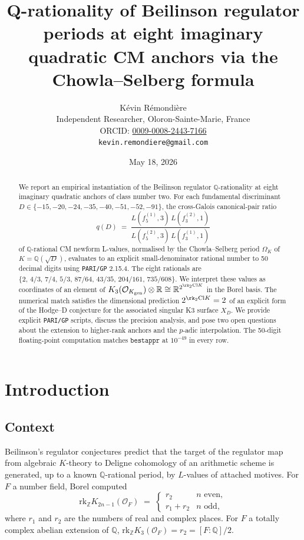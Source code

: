 \documentclass[11pt,a4paper]{amsart}
\title{Q-rationality of Beilinson regulator periods at eight imaginary
quadratic CM anchors via the Chowla--Selberg formula}
\author{K\'evin R\'emondi\`ere\\
\small Independent Researcher, Oloron-Sainte-Marie, France\\
\small ORCID: \href{https://orcid.org/0009-0008-2443-7166}{0009-0008-2443-7166}\\
\small \texttt{kevin.remondiere@gmail.com}}
\date{May 18, 2026}
\theoremstyle{plain}
\theoremstyle{definition}
\newcommand{\Q}{\mathbb{Q}}
\newcommand{\Z}{\mathbb{Z}}
\newcommand{\R}{\mathbb{R}}
\newcommand{\Cl}{\mathrm{Cl}}
\newcommand{\rkk}{\mathrm{rk}}
\begin{document}
\begin{abstract}
We report an empirical instantiation of the Beilinson regulator
$\Q$-rationality at eight imaginary quadratic anchors of class number two.
For each fundamental discriminant
$D \in \{-15,-20,-24,-35,-40,-51,-52,-91\}$, the cross-Galois canonical-pair
ratio
\[
  q(D) \;=\; \frac{L(f_5^{(1)},3)\,L(f_3^{(2)},1)}{L(f_5^{(2)},3)\,L(f_3^{(1)},1)}
\]
of $\Q$-rational CM newform L-values, normalised by the Chowla--Selberg period
$\Omega_K$ of $K=\Q(\sqrt{D})$, evaluates to an explicit small-denominator
rational number to 50 decimal digits using \texttt{PARI/GP} 2.15.4. The
eight rationals are
$\{2,\,4/3,\,7/4,\,5/3,\,87/64,\,43/35,\,204/161,\,735/608\}$.
We interpret these values as coordinates of an element of
$K_3(\mathcal{O}_{K_{\mathrm{gen}}})\otimes\R \cong \R^{2^{\rk_2 \Cl K}}$ in
the Borel basis. The numerical match satisfies the dimensional prediction
$2^{\rk_2 \Cl K} = 2$ of an explicit form of the Hodge--D conjecture for the
associated singular K3 surface $X_D$. We provide explicit
\texttt{PARI/GP} scripts, discuss the precision analysis, and pose two open
questions about the extension to higher-rank anchors and the $p$-adic
interpolation. The 50-digit floating-point computation matches
$\texttt{bestappr}$ at $10^{-49}$ in every row.
\end{abstract}

\maketitle

\section{Introduction}\label{sec:intro}

\subsection{Context}

Beilinson's regulator conjectures \cite{Beilinson1985} predict that the
target of the regulator map from algebraic $K$-theory to Deligne
cohomology of an arithmetic scheme is generated, up to a known
$\Q$-rational period, by $L$-values of attached motives. For
$F$ a number field, Borel \cite{Borel1974} computed
\[
  \rkk_\Z K_{2n-1}(\mathcal{O}_F) \;=\;
  \begin{cases} r_2 & n \text{ even}, \\ r_1 + r_2 & n \text{ odd}, \end{cases}
\]
where $r_1$ and $r_2$ are the numbers of real and complex places. For
$F$ a totally complex abelian extension of $\Q$,
$\rkk_\Z K_3(\mathcal{O}_F) = r_2 = [F:\Q]/2$.
\end{document}
